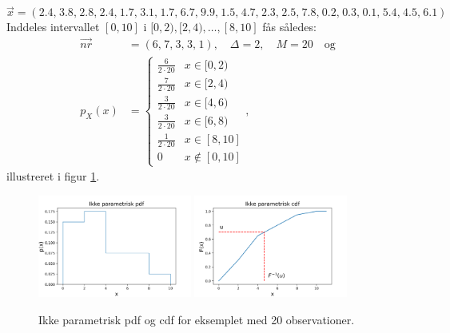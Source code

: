 \documentclass{article}
\begin{document}
$$\vec{x} = \left(2.4,\hspace{1pt} 3.8,\hspace{1pt} 2.8,\hspace{1pt} 2.4,\hspace{1pt} 1.7,\hspace{1pt} 3.1,\hspace{1pt} 1.7,\hspace{1pt} 6.7,\hspace{1pt} 9.9,\hspace{1pt} 1.5,\hspace{1pt} 4.7,\hspace{1pt} 2.3,\hspace{1pt} 2.5,\hspace{1pt} 7.8,\hspace{1pt} 0.2,\hspace{1pt} 0.3,\hspace{1pt} 0.1,\hspace{1pt} 5.4,\hspace{1pt} 4.5,\hspace{1pt} 6.1 \right)$$
Inddeles intervallet $[0,10]$ i $[0,2), [2,4), \dots, [8,10]$ fås således:
\begin{align*}
\vec{nr} &= (6,\hspace{1pt} 7,\hspace{1pt} 3,\hspace{1pt} 3,\hspace{1pt} 1), \quad \Delta = 2, \quad M = 20 \quad \text{og} \\
p_X(x) &= \begin{cases}
\frac{6}{2\cdot 20} & x \in [0,2) \\
\frac{7}{2\cdot 20} & x \in [2,4) \\
\frac{3}{2\cdot 20} & x \in [4,6) \\
\frac{3}{2\cdot 20} & x \in [6,8) \\
\frac{1}{2\cdot 20} & x \in [8,10] \\
0 & x \notin [0,10]
\end{cases},
\end{align*}
illustreret i figur \ref{fig:ikke_para_pdf}. 
\begin{figure}[H]
\centering
\includegraphics[width = 0.45\textwidth]{ikke_para_pdf.png}
\includegraphics[width = 0.45\textwidth]{ikke_para_cdf.png}
\caption{Ikke parametrisk pdf og cdf for eksemplet med 20 observationer.} \label{fig:ikke_para_pdf}
\end{figure}
\end{document}
